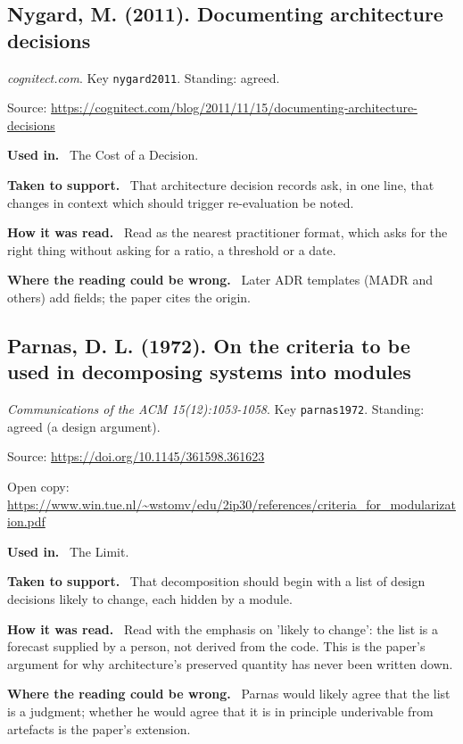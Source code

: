 \documentclass[11pt,oneside]{article}
\newcommand{\field}[1]{\par\noindent\textbf{\color{accent}#1.}\ }
\begin{document}
\hypertarget{src:nygard2011}{}
\subsection*{Nygard, M. (2011). Documenting architecture decisions}
\noindent\small\emph{cognitect.com}. Key \texttt{nygard2011}. Standing: agreed.
\par\noindent\small Source: \url{https://cognitect.com/blog/2011/11/15/documenting-architecture-decisions}
\normalsize
\field{Used in} The Cost of a Decision.
\field{Taken to support} That architecture decision records ask, in one line, that changes in context which should trigger re-evaluation be noted.
\field{How it was read} Read as the nearest practitioner format, which asks for the right thing without asking for a ratio, a threshold or a date.
\field{Where the reading could be wrong} Later ADR templates (MADR and others) add fields; the paper cites the origin.

\hypertarget{src:parnas1972}{}
\subsection*{Parnas, D. L. (1972). On the criteria to be used in decomposing systems into modules}
\noindent\small\emph{Communications of the ACM 15(12):1053-1058}. Key \texttt{parnas1972}. Standing: agreed (a design argument).
\par\noindent\small Source: \url{https://doi.org/10.1145/361598.361623}
\par\noindent\small Open copy: \url{https://www.win.tue.nl/~wstomv/edu/2ip30/references/criteria_for_modularization.pdf}
\normalsize
\field{Used in} The Limit.
\field{Taken to support} That decomposition should begin with a list of design decisions likely to change, each hidden by a module.
\field{How it was read} Read with the emphasis on 'likely to change': the list is a forecast supplied by a person, not derived from the code. This is the paper's argument for why architecture's preserved quantity has never been written down.
\field{Where the reading could be wrong} Parnas would likely agree that the list is a judgment; whether he would agree that it is in principle underivable from artefacts is the paper's extension.

\hypertarget{src:prechelt2001}{}
\end{document}
